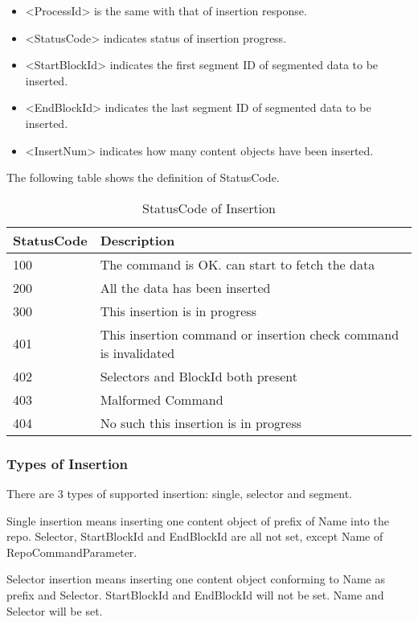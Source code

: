 \documentclass{acm_proc_article-sp}
\begin{document}
\begin{itemize}
\item <ProcessId> is the same with that of insertion response.
\item <StatusCode> indicates status of insertion progress.
\item <StartBlockId> indicates the first segment ID of segmented data to be inserted.
\item <EndBlockId> indicates the last segment ID of segmented data to be inserted.
\item <InsertNum> indicates how many content objects have been inserted.
\end{itemize}

The following table shows the definition of StatusCode.

\begin{table}[!hbp]
\centering

\begin{tabular}{l l}

\hline
StatusCode & Description \\
\hline
100 & The command is OK. can start to fetch the data \\
200 & All the data has been inserted \\
300 & This insertion is in progress \\
401 & This insertion command or insertion check command is invalidated \\
402 & Selectors and BlockId both present\\
403 & Malformed Command \\
404 & No such this insertion is in progress \\
\hline

\end{tabular}
\caption{StatusCode of Insertion}
\end{table}

\subsubsection{Types of Insertion}
There are 3 types of supported insertion: single, selector and segment.

Single insertion means inserting one content object of prefix of Name into the repo. Selector, StartBlockId and EndBlockId are all not set, except Name of RepoCommandParameter.

Selector insertion means inserting one content object conforming to Name as prefix and Selector. StartBlockId and EndBlockId will not be set. Name and Selector will be set.
\end{document}
